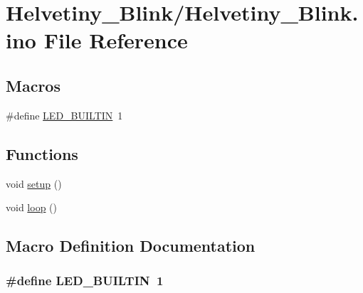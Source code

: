 \hypertarget{Helvetiny__Blink_8ino}{\section{Helvetiny\-\_\-\-Blink/\-Helvetiny\-\_\-\-Blink.ino File Reference}
\label{Helvetiny__Blink_8ino}
}
\subsection*{Macros}
\begin{DoxyCompactItemize}
\item 
\#define \hyperlink{Helvetiny__Blink_8ino_a450a7c16ead7b3c7b882536b08f30a00}{L\-E\-D\-\_\-\-B\-U\-I\-L\-T\-I\-N}~1
\end{DoxyCompactItemize}
\subsection*{Functions}
\begin{DoxyCompactItemize}
\item 
void \hyperlink{Helvetiny__Blink_8ino_a4fc01d736fe50cf5b977f755b675f11d}{setup} ()
\item 
void \hyperlink{Helvetiny__Blink_8ino_afe461d27b9c48d5921c00d521181f12f}{loop} ()
\end{DoxyCompactItemize}


\subsection{Macro Definition Documentation}
\hypertarget{Helvetiny__Blink_8ino_a450a7c16ead7b3c7b882536b08f30a00}{
\subsubsection[{L\-E\-D\-\_\-\-B\-U\-I\-L\-T\-I\-N}]{\setlength{\rightskip}{0pt plus 5cm}\#define L\-E\-D\-\_\-\-B\-U\-I\-L\-T\-I\-N~1}}\label{Helvetiny__Blink_8ino_a450a7c16ead7b3c7b882536b08f30a00}



